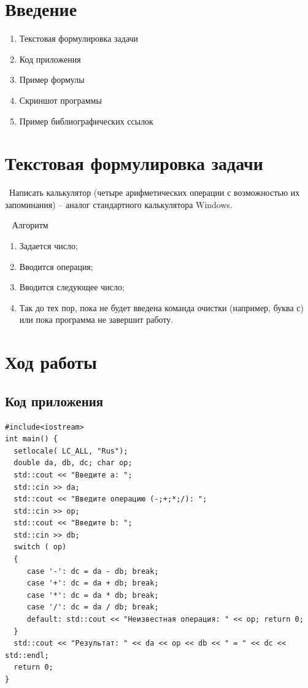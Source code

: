 \documentclass[12pt,a4paper]{scrartcl}
\begin{document}
\section{Введение}
\label{sec:intro}


\begin{enumerate}
 \item Текстовая формулировка задачи
 \item Код приложения
 \item Пример формулы
 \item Скриншот программы
 \item Пример библиографических ссылок
\end{enumerate}



\section{Текстовая формулировка задачи}
\label{sec:exp}
 \ {Написать калькулятор (четыре арифметических операции с возможностью их запоминания) – аналог стандартного калькулятора Windows.}
 
\    {    Алгоритм}
\begin{enumerate}
\item 	Задается число;
\item	Вводится операция;
\item	Вводится следующее число;
\item	Так до тех пор, пока не будет введена команда очистки (например, буква с) или пока программа не завершит работу.
\end{enumerate}



\section{Ход работы}
\label{sec:exp}

\subsection{Код приложения}
\label{sec:exp:code}
\begin{verbatim}
#include<iostream>
int main() {
  setlocale( LC_ALL, "Rus");
  double da, db, dc; char op;
  std::cout << "Введите а: ";
  std::cin >> da;
  std::cout << "Введите операцию (-;+;*;/): ";
  std::cin >> op;
  std::cout << "Введите b: ";
  std::cin >> db;
  switch ( op)
  {
     case '-': dc = da - db; break;
     case '+': dc = da + db; break;
     case '*': dc = da * db; break;
     case '/': dc = da / db; break;
     default: std::cout << "Неизвестная операция: " << op; return 0;
  }
  std::cout << "Результат: " << da << op << db << " = " << dc << std::endl;
  return 0;
}
\end{verbatim}
\end{document}
